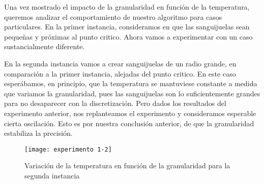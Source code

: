 Una vez mostrado el impacto de la granularidad en función de la temperatura, queremos analizar el comportamiento de nuestro algoritmo para casos particulares. En la primer instancia, consideramos en que las sanguijuelas sean peque\`nas y próximas al punto critico. Ahora vamos a experimentar con un caso sustancialmente diferente. 

En la segunda instancia vamos a crear sanguijuelas de un radio grande, en comparación a la primer instancia, alejadas del punto critico. En este caso esperábamos, en principio, que la temperatura se mantuviese constante a medida que variamos la granularidad, pues las sanguijuelas son lo suficientemente grandes para no desaparecer con la discretizaci\'on. Pero dados los resultados del experimento anterior, nos replanteamos el experimento y consideramos esperable cierta oscilación. Esto es por nuestra conclusión anterior, de que la granularidad estabiliza la precisión. 

\begin{figure}[h]
    \texttt{[image: experimento 1-2]}
    \caption{Variación de la temperatura en función de la granularidad para la segunda instancia}
    \label{fig:exp12}
\end{figure}